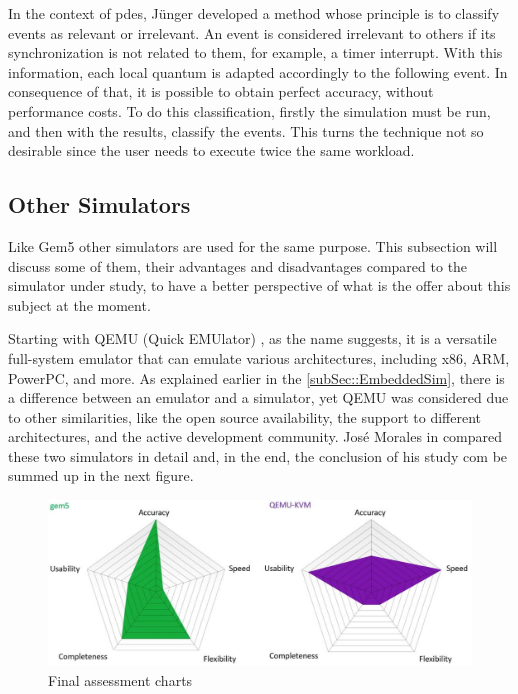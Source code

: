 In the context of \gls{pdes}, Jünger developed a method whose principle is to classify events as relevant or irrelevant. An event is considered irrelevant to others if its synchronization is not related to them, for example, a timer interrupt. With this information, each local quantum is adapted accordingly to the following event. In consequence of that, it is possible to obtain perfect accuracy, without performance costs. To do this classification, firstly the simulation must be run, and then with the results, classify the events. This turns the technique not so desirable since the user needs to execute twice the same workload. 


\subsection{Other Simulators}


Like Gem5 other simulators are used for the same purpose. This subsection will discuss some of them, their advantages and disadvantages compared to the simulator under study, to have a better perspective of what is the offer about this subject at the moment. 

Starting with QEMU (Quick EMUlator) \cite{theQEMUsimulator}, as the name suggests, it is a versatile full-system emulator that can emulate various architectures, including x86, ARM, PowerPC, and more. As explained earlier in the \autoref{subSec::EmbeddedSim}, there is a difference between an emulator and a simulator, yet QEMU was considered due to other similarities, like the open source availability, the support to different architectures, and the active development community. José Morales in \cite{morales2016evaluating} compared these two simulators in detail and, in the end, the conclusion of his study com be summed up in the next figure.

\begin{figure}[H]
	\centering
 	\includegraphics[width=0.8\linewidth]{Images/gem5VSQEMU.png}
 	\caption{Final assessment charts \cite{morales2016evaluating}}
	 \label{fig_gem5VSQEMU}
\end{figure}

